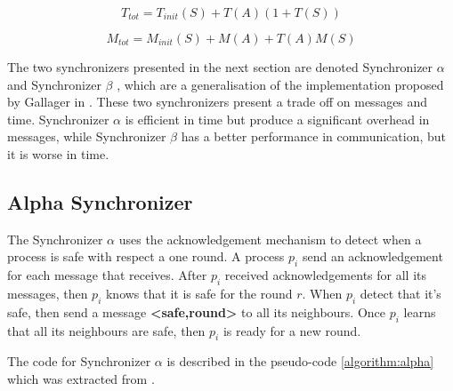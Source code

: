 \begin{equation}
\label{ec:mess}
 T_{tot} = T_{init}(S) + T(A)(1+T(S)) 
\end{equation}

\begin{equation}
\label{ec:time}
M_{tot} = M_{init}(S) + M(A) + T(A)M(S) 
\end{equation}


The two synchronizers presented in the next section are denoted Synchronizer $\alpha$ and Synchronizer $\beta$ \cite{awerbuch1985complexity}, which are a generalisation of the implementation proposed by Gallager in \cite{gallager1982distributed}. These two synchronizers present a trade off on messages and time. Synchronizer $\alpha$ is efficient in time but produce a significant overhead in messages, while Synchronizer $\beta$ has a better performance in communication, but it is worse in time.



\subsection{Alpha Synchronizer}

The Synchronizer $\alpha$ uses the acknowledgement mechanism to detect when a process is safe with respect a one round. A process $p_i$ send an acknowledgement for each message that receives. After $p_i$ received acknowledgements for all its messages, then $p_i$ knows that it is safe for the round $r$. When $p_i$ detect that it's safe, then send a message \textbf{<safe,round>} to all its neighbours. Once $p_i$ learns that all its neighbours are safe, then $p_i$ is ready for a new round.

The code for Synchronizer $\alpha$ is described in the pseudo-code \ref{algorithm:alpha} which was extracted from \cite{attiya2004distributed}.  

